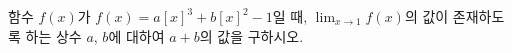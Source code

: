 함수 $f(x)$가 $f(x)=a[x]^3+b[x]^2-1$일 때, $\displaystyle\lim_{x\to 1} f(x)$의 값이 존재하도록 하는 상수 $a$, $b$에 대하여 $a+b$의 값을 구하시오. 
